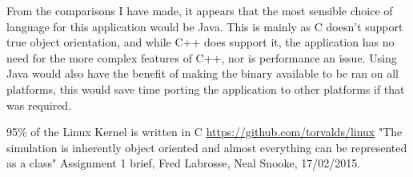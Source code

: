 \documentclass[10pt]{article}
\begin{document}
  From the comparisons I have made, it appears that the most sensible choice of language for this application would be Java. This is mainly as C doesn't support true object orientation, and while C++ does support it, the application has no need for the more complex features of C++, nor is performance an issue. Using Java would also have the benefit of making the binary available to be ran on all platforms, this would save time porting the application to other platforms if that was required. 

  
  \begin{thebibliography}{1}
    95\% of the Linux Kernel is written in C \url{https://github.com/torvalds/linux}
    "The simulation is inherently object oriented and almost everything can be represented as a class" Assignment 1 brief, Fred Labrosse, Neal Snooke, 17/02/2015.

  \end{thebibliography}
\end{document}
